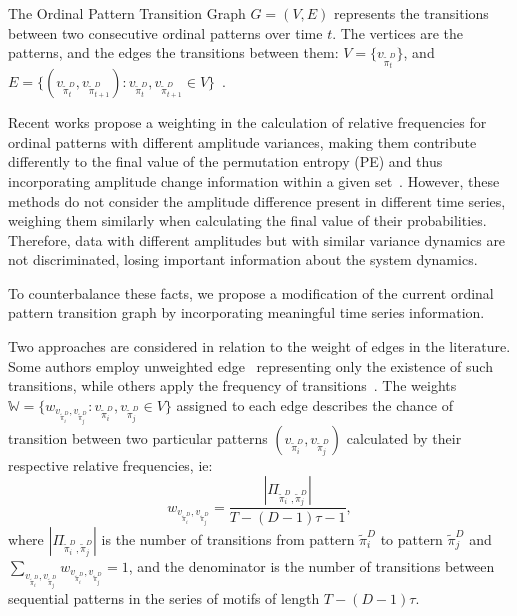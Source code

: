 \documentclass[journal]{IEEEtran}
\begin{document}
The Ordinal Pattern Transition Graph ${G} = ({V}, {E})$ 
represents the transitions between two consecutive ordinal patterns over time $t$.
The vertices are the patterns, and the edges the transitions between them:
$V = \{v_{\widetilde\pi_t^D}\}$, and 
$E = \{(v_{\widetilde\pi_t^D}, v_{\widetilde\pi_{t+1}^D}): v_{\widetilde\pi_t^D}, v_{\widetilde\pi_{t+1}^D} \in V \}$~\cite{LearningandDistinguishingTimeSeriesDynamicsViaOrdinalPatternsTransitionGraphs2019}.

Recent works propose a weighting in the calculation of relative frequencies for ordinal patterns with different amplitude variances, making them contribute differently to the final value of the permutation entropy (PE) and thus incorporating amplitude change information within a given set~\cite{Fadlallah2013Weightedpermutation}.
However, these methods do not consider the amplitude difference present in different time series, weighing them similarly when calculating the final value of their probabilities.
Therefore, data with different amplitudes but with similar variance dynamics are not discriminated, losing important information about the system dynamics.

To counterbalance these facts, we propose a modification of the current ordinal pattern transition graph by incorporating meaningful time series information.

Two approaches are considered in relation to the weight of edges in the literature.
Some authors employ unweighted edge~\cite{McCullough2015lagged,Kulp2016ordinal} representing only the existence of such transitions, while others apply the frequency of transitions~\cite{Sorrentino2015periodic,Zhang2017ConstructingOP}.
The weights $\mathbb{W} = \{w_{v_{\widetilde{\pi}^D_i}, v_{\widetilde\pi^D_j}}: v_{\widetilde\pi^D_i}, v_{\widetilde\pi^D_j} \in V \}$ assigned to each edge describes the chance of transition between two particular patterns $(v_{\widetilde\pi^D_i}, v_{\widetilde\pi^D_j})$ calculated by their respective relative frequencies, ie:
\begin{equation}
w_{v_{\widetilde\pi^D_i}, v_{\widetilde\pi^D_j}} = \frac{|\Pi_{\widetilde\pi^D_i,\widetilde\pi^D_j}|}{T-(D-1)\tau-1},
\end{equation}
where $|\Pi_{\widetilde\pi^D_i,\widetilde\pi^D_j}|$ is the number of transitions from pattern $\widetilde\pi^D_i$ to pattern $\widetilde\pi^D_j$ and $\sum_{v_{\widetilde\pi^D_i}, v_{\widetilde\pi^D_j}}w_{v_{\widetilde\pi^D_i}, v_{\widetilde\pi^D_j}} = 1$,
and the denominator is the number of transitions between sequential patterns in the series of motifs of length $T-(D-1)\tau$.
\end{document}
